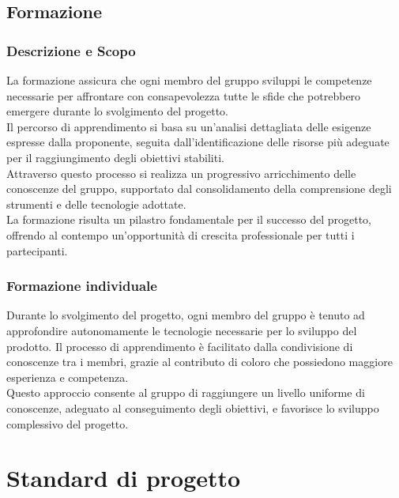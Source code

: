 \documentclass[10pt]{article}
\begin{document}
\begin{justify}
    \subsection{Formazione}
    \label{formazione}
    \subsubsection{Descrizione e Scopo}
    La formazione assicura che ogni membro del gruppo sviluppi le competenze necessarie per affrontare con consapevolezza tutte le sfide che potrebbero emergere durante lo svolgimento del progetto.\\
    Il percorso di apprendimento si basa su un'analisi dettagliata delle esigenze espresse dalla proponente, seguita dall'identificazione delle risorse più adeguate per il raggiungimento degli obiettivi stabiliti.\\
    Attraverso questo processo si realizza un progressivo arricchimento delle conoscenze del gruppo, supportato dal consolidamento della comprensione degli strumenti e delle tecnologie adottate.\\
    La formazione risulta un pilastro fondamentale per il successo del progetto, offrendo al contempo un'opportunità di crescita professionale per tutti i partecipanti.

    \subsubsection{Formazione individuale}
    Durante lo svolgimento del progetto, ogni membro del gruppo è tenuto ad approfondire autonomamente le tecnologie necessarie per lo sviluppo del prodotto. Il processo di apprendimento è facilitato dalla condivisione di conoscenze tra i membri, grazie al contributo di coloro che possiedono maggiore esperienza e competenza.\\
    Questo approccio consente al gruppo di raggiungere un livello uniforme di conoscenze, adeguato al conseguimento degli obiettivi, e favorisce lo sviluppo complessivo del progetto.

\newpage
\section{Standard di progetto}


\end{justify}
\end{document}
